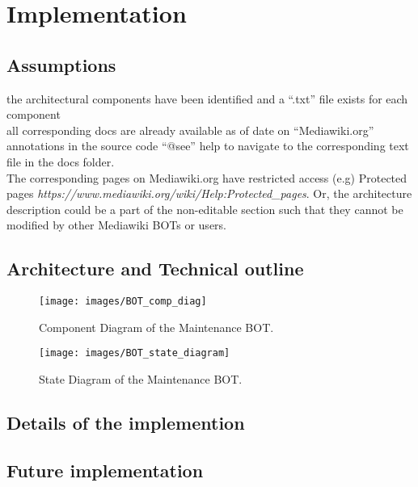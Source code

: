 \chapter{Implementation}\label{chapter:Implementation}

\section{Assumptions}
\indent the architectural components have been identified and a \enquote{.txt} file exists for each component
\\\indent all corresponding docs are already available as of date on  \enquote{Mediawiki.org}
\\\indent annotations in the source code \enquote{@see} help to navigate to the corresponding text file in the docs folder.
\\\indent The corresponding pages on Mediawiki.org have restricted access (e.g) Protected pages \emph{https://www.mediawiki.org/wiki/Help:Protected\_pages}. Or, the architecture description could be a part of the non-editable section such that they cannot be modified by other Mediawiki BOTs or users.
\section{Architecture and Technical outline}

\begin{figure}[H]
  \centering
  \texttt{[image: images/BOT\_comp\_diag]}
  \caption[Component Diagram of the Maintenance BOT]{Component Diagram of the Maintenance BOT.}\label{fig:BOT_comp_diag}
\end{figure}


\begin{figure}[H]
  \centering
  \texttt{[image: images/BOT\_state\_diagram]}
  \caption[State Diagram of the Maintenance BOT]{State Diagram of the Maintenance BOT.}\label{fig:BOT_comp_diag}
\end{figure}

\section{Details of the implemention}

\section{Future implementation}

		

